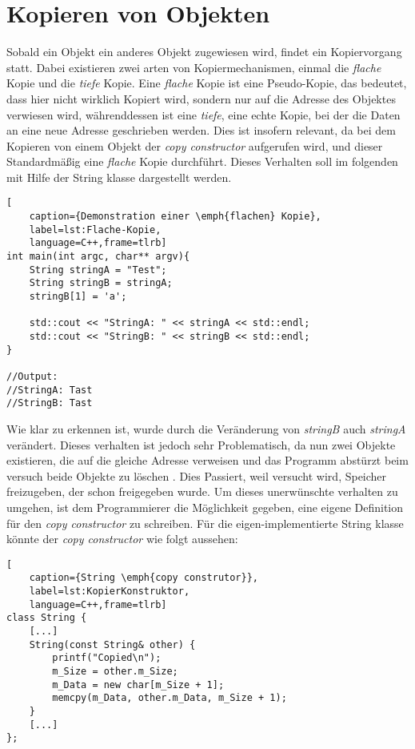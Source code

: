 \section{Kopieren von Objekten}\label{sec:kopieren}
Sobald ein Objekt ein anderes Objekt zugewiesen wird, findet ein Kopiervorgang statt. Dabei
existieren zwei arten von Kopiermechanismen, einmal die \emph{flache} Kopie und die \emph{tiefe}
Kopie. Eine \emph{flache} Kopie ist eine Pseudo-Kopie, das bedeutet, dass hier nicht wirklich
Kopiert wird, sondern nur auf die Adresse des Objektes verwiesen wird, währenddessen ist eine
\emph{tiefe}, eine echte Kopie, bei der die Daten an eine neue Adresse geschrieben werden. Dies
ist insofern relevant, da bei dem Kopieren von einem Objekt der \emph{copy constructor}
aufgerufen wird, und dieser Standardmäßig eine \emph{flache} Kopie durchführt. Dieses Verhalten
soll im folgenden mit Hilfe der String klasse dargestellt werden.

\begin{lstlisting}[
    caption={Demonstration einer \emph{flachen} Kopie},
    label=lst:Flache-Kopie,
    language=C++,frame=tlrb]
int main(int argc, char** argv){
	String stringA = "Test";
	String stringB = stringA;
	stringB[1] = 'a';

	std::cout << "StringA: " << stringA << std::endl;
	std::cout << "StringB: " << stringB << std::endl;
}

//Output:
//StringA: Tast
//StringB: Tast
\end{lstlisting}

Wie klar zu erkennen ist, wurde durch die Veränderung von \emph{stringB} auch \emph{stringA}
verändert. Dieses verhalten ist jedoch sehr Problematisch, da nun zwei Objekte existieren, die
auf die gleiche Adresse verweisen und das Programm abstürzt beim versuch beide Objekte zu löschen
. Dies Passiert, weil versucht wird, Speicher freizugeben, der schon freigegeben wurde. Um dieses
unerwünschte verhalten zu umgehen, ist dem Programmierer die Möglichkeit gegeben, eine eigene
Definition für den \emph{copy constructor} zu schreiben. Für die eigen-implementierte String
klasse könnte der \emph{copy constructor} wie folgt aussehen:

\begin{lstlisting}[
    caption={String \emph{copy construtor}},
    label=lst:KopierKonstruktor,
    language=C++,frame=tlrb]
class String {
	[...]
    String(const String& other) {
        printf("Copied\n");
        m_Size = other.m_Size;
        m_Data = new char[m_Size + 1];
        memcpy(m_Data, other.m_Data, m_Size + 1);
    }
	[...]
};
\end{lstlisting}


